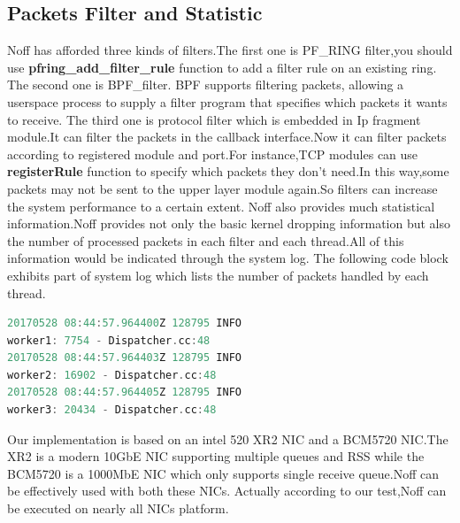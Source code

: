 \documentclass[conference]{IEEEtran}
\begin{document}
\subsection{Packets Filter and Statistic}
Noff has afforded three kinds of filters.The first one is PF\_RING filter,you should use \textbf{pfring\_add\_filter\_rule} function to add a filter rule on an existing ring.
The second one is BPF\_filter. BPF supports filtering packets, allowing a userspace process to supply a filter program that specifies which packets it wants to receive.
The third one is protocol filter which is embedded in Ip fragment module.It can filter the packets in the callback interface.Now it can filter packets according to registered module and port.For instance,TCP modules can use \textbf{registerRule} function to specify which packets they don't need.In this way,some packets may not be sent to the upper layer module again.So filters can increase the system performance to a certain extent.
\newline\indent Noff also provides much statistical information.Noff provides not only the basic kernel dropping information but also the number of processed packets in each filter and each thread.All of this information would be indicated through the system log. The following code block exhibits part of system log which lists the number of packets handled by each thread.
\begin{lstlisting}[language=C]
20170528 08:44:57.964400Z 128795 INFO
worker1: 7754 - Dispatcher.cc:48
20170528 08:44:57.964403Z 128795 INFO
worker2: 16902 - Dispatcher.cc:48
20170528 08:44:57.964405Z 128795 INFO
worker3: 20434 - Dispatcher.cc:48
\end{lstlisting}
\indent Our implementation is based on an intel 520 XR2 NIC and a BCM5720 NIC.The XR2 is a modern 10GbE NIC supporting multiple queues and RSS while the BCM5720 is a 1000MbE NIC which only supports single receive queue.Noff can be effectively used with both these NICs. Actually according to our test,Noff can be executed on nearly all NICs platform.
\end{document}
